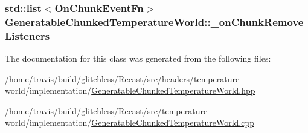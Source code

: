\hypertarget{class_generatable_chunked_temperature_world_a4f5ce92a800ce903982033724d025e09}{
\subsubsection[{\-\_\-on\-Chunk\-Remove\-Listeners}]{\setlength{\rightskip}{0pt plus 5cm}std\-::list$<${\bf On\-Chunk\-Event\-Fn}$>$ Generatable\-Chunked\-Temperature\-World\-::\-\_\-on\-Chunk\-Remove\-Listeners\hspace{0.3cm}{\ttfamily [protected]}}}\label{class_generatable_chunked_temperature_world_a4f5ce92a800ce903982033724d025e09}


The documentation for this class was generated from the following files\-:\begin{DoxyCompactItemize}
\item 
/home/travis/build/glitchless/\-Recast/src/headers/temperature-\/world/implementation/\hyperlink{_generatable_chunked_temperature_world_8hpp}{Generatable\-Chunked\-Temperature\-World.\-hpp}\item 
/home/travis/build/glitchless/\-Recast/src/temperature-\/world/implementation/\hyperlink{_generatable_chunked_temperature_world_8cpp}{Generatable\-Chunked\-Temperature\-World.\-cpp}\end{DoxyCompactItemize}
